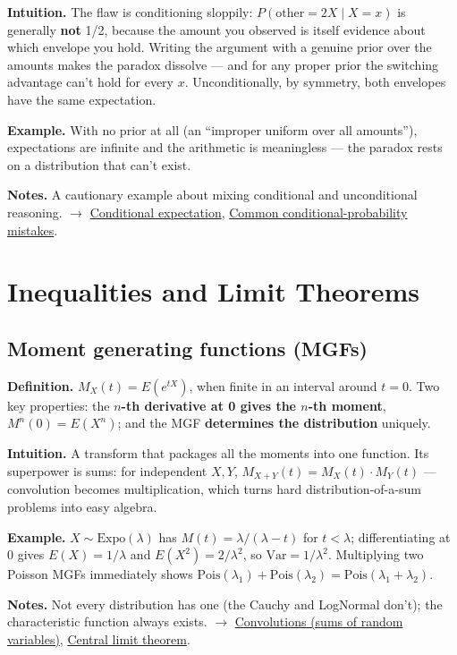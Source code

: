 \documentclass[11pt,a4paper]{article}
\begin{document}
\textbf{Intuition.} The flaw is conditioning sloppily: $P(\text{other} = 2X \mid X = x)$ is generally \textbf{not} 1/2, because the amount you observed is itself evidence about which envelope you hold. Writing the argument with a genuine prior over the amounts makes the paradox dissolve --- and for any proper prior the switching advantage can't hold for every $x$. Unconditionally, by symmetry, both envelopes have the same expectation.

\textbf{Example.} With no prior at all (an ``improper uniform over all amounts''), expectations are infinite and the arithmetic is meaningless --- the paradox rests on a distribution that can't exist.

\textbf{Notes.} A cautionary example about mixing conditional and unconditional reasoning. $\to$ \hyperref[sec:conditional-expectation]{Conditional expectation}, \hyperref[sec:common-conditional-probability-mistakes]{Common conditional-probability mistakes}.


\section{Inequalities and Limit Theorems}

\subsection{Moment generating functions (MGFs)}\label{sec:moment-generating-functions-mgfs}

\textbf{Definition.} $M_X(t) = E(e^{tX})$, when finite in an interval around $t = 0$. Two key properties: the \textbf{$n$-th derivative at 0 gives the $n$-th moment}, $M^{n}(0) = E(X^{n})$; and the MGF \textbf{determines the distribution} uniquely.

\textbf{Intuition.} A transform that packages all the moments into one function. Its superpower is sums: for independent $X, Y$, $M_{X+Y}(t) = M_X(t)\cdot M_Y(t)$ --- convolution becomes multiplication, which turns hard distribution-of-a-sum problems into easy algebra.

\textbf{Example.} $X \sim \mathrm{Expo}(\lambda )$ has $M(t) = \lambda /(\lambda  - t)$ for $t < \lambda$; differentiating at 0 gives $E(X) = 1/\lambda$ and $E(X^{2}) = 2/\lambda ^{2}$, so $\mathrm{Var} = 1/\lambda ^{2}$. Multiplying two Poisson MGFs immediately shows $\mathrm{Pois}(\lambda _{1}) + \mathrm{Pois}(\lambda _{2}) = \mathrm{Pois}(\lambda _{1}+\lambda _{2})$.

\textbf{Notes.} Not every distribution has one (the Cauchy and LogNormal don't); the characteristic function always exists. $\to$ \hyperref[sec:convolutions-sums-of-random-variables]{Convolutions (sums of random variables)}, \hyperref[sec:central-limit-theorem]{Central limit theorem}.
\end{document}
